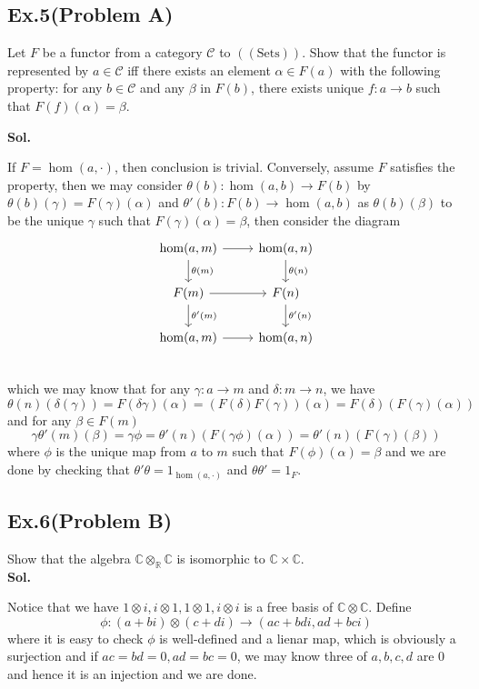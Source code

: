 \documentclass[lang=en,11pt,a4paper,citestyle =authoryear]{elegantpaper}
\begin{document}
\subsection*{Ex.5(Problem A)} 
Let $F$ be a functor from a category $\mathcal{C}$ to $((\text{Sets}))$. Show that the functor is represented by $a\in\mathcal{C}$ iff there exists an element $\alpha\in F(a)$ with the following property: for any $b\in\mathcal{C}$ and any $\beta$ in $F(b)$, there exists unique $f:a\to b$ such that $F(f)(\alpha) = \beta$.
\vspace{0.5em}\par
\textbf{Sol.} \par
If $F = \hom(a,\cdot)$, then conclusion is trivial. Conversely, assume $F$ satisfies the property, then we may consider $\theta(b):\hom(a,b) \to F(b)$ by $\theta(b)(\gamma) = F(\gamma)(\alpha)$ and $\theta'(b):F(b) \to \hom(a,b)$ as $\theta(b)(\beta)$ to be the unique $\gamma$ such that $F(\gamma)(\alpha) = \beta$, then consider the diagram
\[
\begin{tikzcd}
    \hom(a,m)\arrow[r]\arrow[d,"\theta(m)"] & \hom(a,n)\arrow[d,"\theta(n)"] \\    
    F(m)\arrow[r]\arrow[d,"\theta'(m)"] & F(n)\arrow[d,"\theta'(n)"] \\
    \hom(a,m)\arrow[r] & \hom(a,n) \\
\end{tikzcd}
\]
which we may know that for any $\gamma:a\to m$ and $\delta: m\to n$, we have
\[
\theta(n)(\delta(\gamma)) = F(\delta\gamma)(\alpha) = (F(\delta)F(\gamma))(\alpha) = F(\delta)(F(\gamma)(\alpha))
\]
and for any $\beta \in F(m)$
\[
\gamma\theta'(m)(\beta) = \gamma\phi = \theta'(n)(F(\gamma\phi)(\alpha)) = \theta'(n)(F(\gamma)(\beta))
\]
where $\phi$ is the unique map from $a$ to $m$ such that $F(\phi)(\alpha) = \beta$ and we are done by checking that $\theta'\theta = 1_{\hom(a,\cdot)}$ and $\theta\theta' = 1_F$.
\par 
\vspace{0.5em}

\subsection*{Ex.6(Problem B)} 
Show that the algebra $\mathbb{C}\otimes_{\mathbb{R}}\mathbb{C}$ is isomorphic to $\mathbb{C}\times\mathbb{C}$.
\vspace{0.5em}\\
\textbf{Sol.} \par
Notice that we have $1\otimes i, i\otimes 1, 1\otimes 1, i\otimes i$ is a free basis of $\mathbb{C}\otimes \mathbb{C}$. Define
\[
\phi: (a+bi)\otimes(c+di) \to (ac + bdi, ad+bci)
\]
where it is easy to check $\phi$ is well-defined and a lienar map, which is obviously a surjection and if $ac = bd = 0, ad = bc = 0$, we may know three of $a,b,c,d$ are $0$ and hence it is an injection and we are done.
\par 
\vspace{0.5em}

\addappheadtotoc
\end{document}
